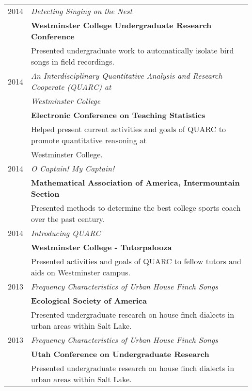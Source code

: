 \documentclass[a4paper,10pt]{article}
\begin{document}
\section{\color{linkcolour}{Selected Posters and Presentations}}
\begin{tabular}{rl}
 \textsc{2014}& \emph{Detecting Singing on the Nest}
\\& \textbf{Westminster College Undergraduate Research Conference}
\\& \small{Presented undergraduate work to automatically isolate bird songs in field recordings.} \\

\textsc{2014}& \emph{An Interdisciplinary Quantitative Analysis and Research Cooperate (QUARC) at} \\
&\emph{Westminster College}
\\ & \textbf{Electronic Conference on Teaching Statistics}
\\ & \small{Helped present current activities and goals of QUARC to promote quantitative reasoning at}
\\ &\small{ Westminster College.} \\

\textsc{2014}& \emph{O Captain! My Captain!}
\\& \textbf{Mathematical Association of America, Intermountain Section}
\\& \small{Presented methods to determine the best college sports coach over the past century.}  \\

\textsc{2014} &\emph{Introducing QUARC}
\\& \textbf{Westminster College - Tutorpalooza}
\\& \small{Presented activities and goals of QUARC to fellow tutors and aids on Westminster campus.} \\

\textsc{2013}& \emph{Frequency Characteristics of Urban House Finch Songs}
\\& \textbf{Ecological Society of America}
\\& \small{Presented undergraduate research on house finch dialects in urban areas within Salt Lake.} \\

\textsc{2013}& \emph{Frequency Characteristics of Urban House Finch Songs}
\\& \textbf{Utah Conference on Undergraduate Research}
\\& \small{Presented undergraduate research on house finch dialects in urban areas within Salt Lake.}
\end{tabular}
\end{document}
